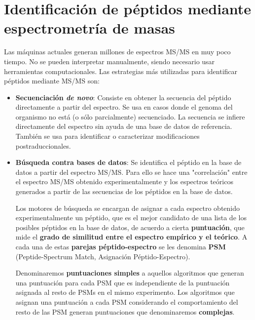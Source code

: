 \chapter{Identificación de péptidos mediante espectrometría de masas}
Las máquinas actuales generan millones de espectros MS/MS en muy poco tiempo. No se pueden interpretar manualmente, siendo necesario usar herramientas computacionales. 
Las estrategias más utilizadas para identificar péptidos mediante MS/MS son:
\begin{itemize}
\item \textbf{Secuenciación \textit{de novo}}: Consiste en obtener la secuencia del péptido directamente a partir del espectro.
Se usa en casos donde el genoma del organismo no está (o sólo parcialmente) secuenciado. La
secuencia se infiere directamente del espectro sin ayuda de una base de datos de referencia.
También se usa para identificar o caracterizar modificaciones postraduccionales.

\item \textbf{Búsqueda contra bases de datos}: Se identifica el péptido en la base de datos a partir del espectro MS/MS. Para ello se hace una "correlación" entre el espectro MS/MS obtenido experimentalmente y los espectros teóricos generados a partir de las secuencias de los péptidos en la base de datos.

Los motores de búsqueda se encargan de asignar a cada espectro obtenido experimentalmente un péptido, que es el mejor candidato de una lista de los posibles péptidos en la base de datos, de acuerdo a cierta \textbf{puntuación}, que mide el \textbf{grado de similitud entre el espectro empírico y el teórico}.
A cada una de estas \textbf{parejas péptido-espectro} se les denomina \textbf{PSM} (Peptide-Spectrum Match, Asignación Péptido-Espectro). 

Denominaremos \textbf{puntuaciones simples} a aquellos algoritmos que generan una puntuación para cada PSM que es independiente de la puntuación asignada al resto de PSMs en el mismo experimento.
Los algoritmos que asignan una puntuación a cada PSM considerando el comportamiento del resto de las PSM generan puntuaciones que denominaremos \textbf{complejas}.
\end{itemize}

